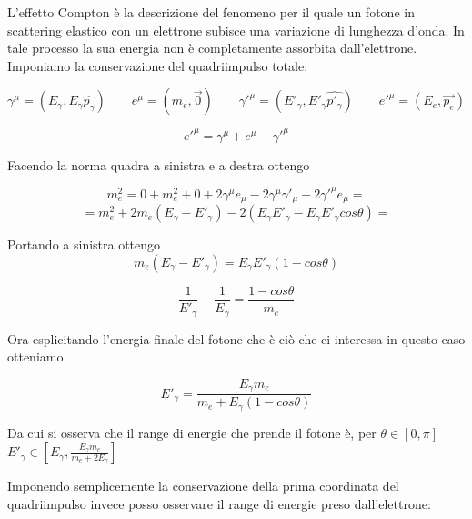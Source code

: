 L'effetto Compton è la descrizione del fenomeno per il quale un fotone in scattering elastico con un elettrone subisce una variazione di lunghezza d'onda. In tale processo la sua energia non è completamente assorbita dall'elettrone. Imponiamo la conservazione del quadriimpulso totale:

\begin{equation}
\gamma^{\mu}=(E_{\gamma},E_{\gamma}\hat{p_{\gamma}})\qquad e^{\mu}=(m_e,\vec{0}) \qquad \gamma'^{\mu}=(E'_{\gamma},E'_{\gamma}\hat{p'_{\gamma}}) \qquad e'^{\mu}=(E_e,\vec{p_e})
\end{equation}

\begin{equation}
e'^{\mu}=\gamma^{\mu}+e^{\mu}-\gamma'^{\mu}
\end{equation}

Facendo la norma quadra a sinistra e a destra ottengo

\begin{equation}
m_e^2=0+m_e^2+0+2\gamma^{\mu}e_{\mu}-2\gamma^{\mu}\gamma'_{\mu}-2\gamma'^{\mu}e_{\mu}=
\end{equation}
\begin{equation}
=m_e^2+2m_e(E_{\gamma}-E'_{\gamma})-2(E_{\gamma}E'_{\gamma}-E_{\gamma}E'_{\gamma}cos\theta)=
\end{equation}

Portando a sinistra ottengo
\begin{equation}
m_e(E_{\gamma}-E'_{\gamma})=E_{\gamma}E'_{\gamma}(1-cos\theta)
\end{equation}

\begin{equation}
\frac{1}{E'_{\gamma}}-\frac{1}{E_{\gamma}}=\frac{1-cos\theta}{m_e}
\end{equation}

Ora esplicitando l'energia finale del fotone che è ciò che ci interessa in questo caso otteniamo

\begin{equation}
E'_{\gamma}=\frac{E_{\gamma}m_e}{m_e+E_{\gamma}(1-cos\theta)}
\end{equation}

Da cui si osserva che il range di energie che prende il fotone è, per $\theta \in [0,\pi]$ $E'_{\gamma} \in [E_{\gamma},\frac{E_{\gamma}m_e}{m_e+2E_{\gamma}}]$

Imponendo semplicemente la conservazione della prima coordinata del quadriimpulso invece posso osservare il range di energie preso dall'elettrone:

